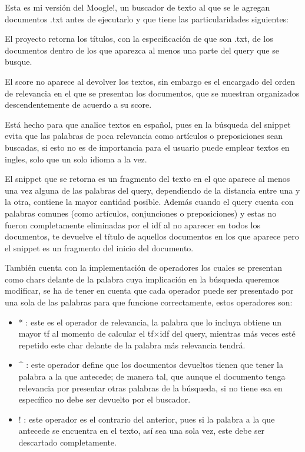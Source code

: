 \documentclass[a4paper,12pt,]{article}
\begin{document}
Esta es mi versión del Moogle!, un buscador de texto al que se le agregan documentos .txt antes de 
ejecutarlo y que tiene las particularidades siguientes: 

El proyecto retorna los títulos, con la especificación de que son .txt, de los documentos dentro de los que 
aparezca al menos una parte del query que se busque. 

El score no aparece al devolver los textos, sin embargo es el encargado del orden de relevancia en el que se 
presentan los documentos, que se muestran organizados descendentemente de acuerdo a su score.

Está hecho para que analice textos en español, pues en la búsqueda del snippet evita que las palabras de poca 
relevancia como artículos o preposiciones sean buscadas, si esto no es de importancia para el usuario puede 
emplear textos en ingles, solo que un solo idioma a la vez.

El snippet que se retorna es un fragmento del texto en el que aparece al menos una vez alguna de las palabras 
del query, dependiendo de la distancia entre una y la otra, contiene la mayor cantidad posible. Además 
cuando el query cuenta con palabras comunes (como artículos, conjunciones o preposiciones) y estas no fueron 
completamente eliminadas por el idf al no aparecer en todos los documentos, te devuelve el título de aquellos 
documentos en los que aparece pero el snippet es un fragmento del inicio del documento.

También cuenta con la implementación de operadores los cuales se presentan como chars delante de la palabra 
cuya implicación en la búsqueda queremos modificar, se ha de tener en cuenta que cada operador puede ser 
presentado por una sola de las palabras para que funcione correctamente, estos operadores son:

\begin{itemize}
    \item * : este es el operador de relevancia, la palabra que lo incluya obtiene un mayor tf al momento 
    de calcular el tf$\times $idf del query, mientras más veces esté repetido este char delante de la palabra 
    más relevancia tendrá.
    
    \item \^{} : este operador define que los documentos devueltos tienen que tener la palabra a la que 
    antecede; de manera tal, que aunque el documento tenga relevancia por presentar otras palabras de la 
    búsqueda, si no tiene esa en específico no debe ser devuelto por el buscador.

    \item ! : este operador es el contrario del anterior, pues si la palabra a la que antecede se encuentra 
    en el texto, así sea una sola vez, este debe ser descartado completamente.

\end{itemize}
\end{document}
